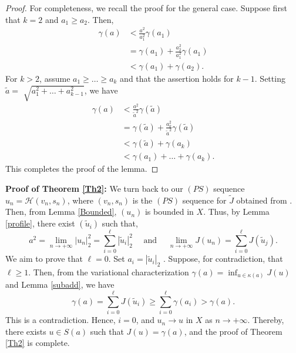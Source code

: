 \documentclass[11pt]{amsart}
\numberwithin{equation}{section}
\begin{document}
{{{\begin{proof}
    {For completeness,  we recall the proof for the general case}. Suppose first that $k=2$ and $a_1 \geq a_2$. Then,
    $$
    \begin{aligned}
        \gamma(a) & <\frac{a^2}{a_1^2} \gamma\left(a_1\right) \\
        & =\gamma\left(a_1\right)+\frac{a_2^2}{a_1^2} \gamma\left(a_1\right) \\
        & <\gamma\left(a_1\right)+\gamma\left(a_2\right) .
    \end{aligned}
    $$
    For $k>2$, assume $a_1 \geq \ldots \geq a_k$ and that the assertion holds for $k-1$. Setting  $\tilde{a}=$ $\sqrt{a_1^2+\ldots+a_{k-1}^2}$, we have
    $$
    \begin{aligned}
        \gamma(a) & <\frac{a^2}{\tilde{a}^2} \gamma(\tilde{a}) \\
        & =\gamma(\tilde{a})+\frac{a_k^2}{\tilde{a}^2} \gamma(\tilde{a})\\
        & <\gamma(\tilde{a})+\gamma\left(a_k\right) \\
        & <\gamma\left(a_1\right)+\ldots+\gamma\left(a_k\right).
    \end{aligned}
    $$
    This completes the proof of the lemma.
\end{proof}
\noindent\textbf{Proof of Theorem \ref{Th2}:}
We turn back to our $(PS)$ sequence
$u_n=\mathcal{H}(v_n,s_n)$,  where $(v_n,s_n)$ is the $(PS)$ sequence for $ \tilde{J} $ obtained from \cite[Proposition 2.2]{Jean}.
{Then, from Lemma \ref{Bounded}, $(u_n)$ is bounded in $X$.} Thus, by Lemma \ref{profile},
there exist $ (\widetilde{u}_i) $
such that,
$$
a^2=\lim _{n \rightarrow+ \infty} \left| u_n\right|^2_2 =\sum_{i=0}^{\ell} \left| \widetilde{u}_i\right|^2_2 \quad \text{ and } \quad \lim _{n \rightarrow+\infty} J\left(u_n\right)=\sum_{i=0}^{\ell} J\left(\tilde{u}_j\right).
$$
We aim to prove that $\ell=0$. Set $a_i=|\widetilde{u}_i|_2$ . Suppose, for contradiction, that $\ell \geq 1$. Then, from the variational characterization $\gamma(a)=\inf_{u \in \kappa(a)} J(u)$ and Lemma \ref{subadd}, we  have
$$
\gamma(a)=\sum_{i=0}^\ell J\left(\tilde{u}_i\right) \geq \sum_{i=0}^{\ell} \gamma\left({a}_i\right)>\gamma(a).
$$
This is a contradiction. Hence, $i=0$, and $u_n\to u$ in $X$ as $n\to+\infty$. Thereby, there exists ${u} \in S(a)$ such that
$J(u)=\gamma(a)$, and the proof of Theorem \ref{Th2} is complete.


}}}
\end{document}
